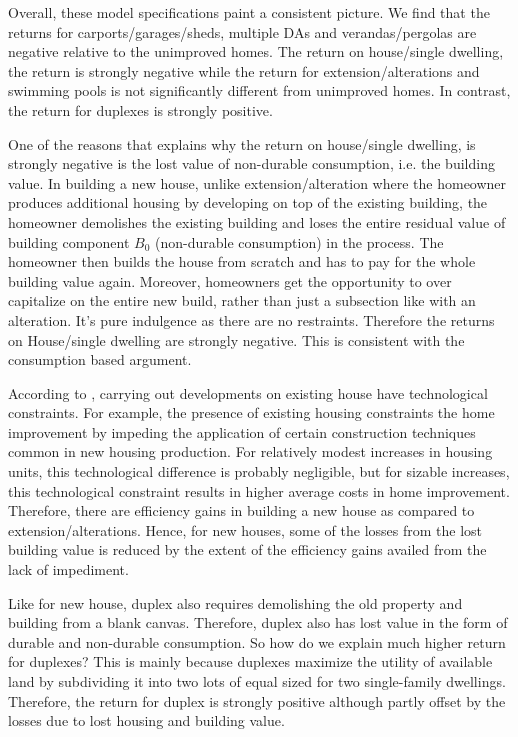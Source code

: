\documentclass[AEJ,reqno, draftmode]{AEA} %
\begin{document}
Overall, these model specifications paint a consistent picture. We find that the returns for carports/garages/sheds, multiple DAs and verandas/pergolas are negative relative to the unimproved homes. The return on house/single dwelling, the return is strongly negative while the return for extension/alterations and swimming pools is not significantly different from unimproved homes. In contrast, the return for duplexes is strongly positive.

One of the reasons that explains why the return on house/single dwelling, is strongly negative is the lost value of non-durable consumption, i.e. the building value. In building a new house, unlike extension/alteration where the homeowner produces additional housing by developing on top of the existing building, the homeowner demolishes the existing building and loses the entire residual value of building component $B_0$ (non-durable consumption) in the process. The homeowner then builds the house from scratch and has to pay for the whole building value again. Moreover, homeowners get the opportunity to over capitalize on the entire new build, rather than just a subsection like with an alteration. It's pure indulgence as there are no restraints. Therefore the returns on House/single dwelling are strongly negative. This is consistent with the consumption based argument.

According to \citet{potepan1989interest}, carrying out developments on existing house have technological constraints. For example, the presence of existing housing constraints the home improvement by impeding the application of certain construction techniques common in new housing production. For relatively modest increases in housing units, this technological difference is probably negligible, but for sizable increases, this technological constraint results in higher average costs in home improvement. Therefore, there are efficiency gains in building a new house as compared to extension/alterations. Hence, for new houses, some of the losses from the lost building value is reduced by the extent of the efficiency gains availed from the lack of impediment.

Like for new house, duplex also requires demolishing the old property and building from a blank canvas. Therefore, duplex also has lost value in the form of durable and non-durable consumption. So how do we explain much higher return for duplexes? This is mainly because duplexes maximize the utility of available land by subdividing it into two lots of equal sized for two single-family dwellings. Therefore, the return for duplex is strongly positive although partly offset by the losses due to lost housing and building value.
\end{document}
